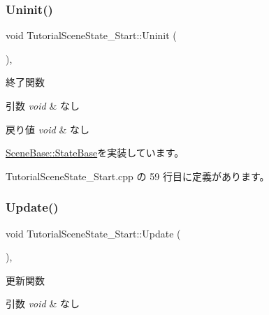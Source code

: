 \subsubsection{\texorpdfstring{Uninit()}{Uninit()}}
{\footnotesize\ttfamily void Tutorial\+Scene\+State\+\_\+\+Start\+::\+Uninit (\begin{DoxyParamCaption}{ }\end{DoxyParamCaption})\hspace{0.3cm}{\ttfamily [override]}, {\ttfamily [virtual]}}



終了関数 


\begin{DoxyParams}{引数}
{\em void} & なし \\
\hline
\end{DoxyParams}

\begin{DoxyRetVals}{戻り値}
{\em void} & なし \\
\hline
\end{DoxyRetVals}


\mbox{\hyperlink{class_scene_base_1_1_state_base_a2763fa37e45b39bd8d3bbb735c76c59b}{Scene\+Base\+::\+State\+Base}}を実装しています。



 Tutorial\+Scene\+State\+\_\+\+Start.\+cpp の 59 行目に定義があります。

\mbox{\label{class_tutorial_scene_state___start_a93c322692bf56172f383d3e5b17cd85c}} 
\subsubsection{\texorpdfstring{Update()}{Update()}}
{\footnotesize\ttfamily void Tutorial\+Scene\+State\+\_\+\+Start\+::\+Update (\begin{DoxyParamCaption}{ }\end{DoxyParamCaption})\hspace{0.3cm}{\ttfamily [override]}, {\ttfamily [virtual]}}



更新関数 


\begin{DoxyParams}{引数}
{\em void} & なし \\
\hline
\end{DoxyParams}

